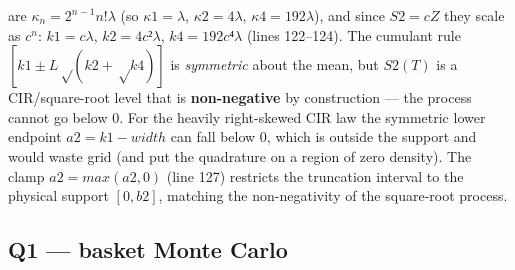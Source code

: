 \documentclass[
  11pt,
]{article}
\begin{document}
\begin{enumerate}
  are \(κ_n = 2^{n−1} n! λ\) (so \(κ1=λ\), \(κ2=4λ\), \(κ4=192λ\)), and
  since \(S2=cZ\) they scale as \(c^n\): \(k1=cλ\), \(k2=4c²λ\),
  \(k4=192c⁴λ\) (lines 122--124). The cumulant rule
  \([k1 ± L√(k2+√k4)]\) is \emph{symmetric} about the mean, but
  \(S2(T)\) is a CIR/square-root level that is \textbf{non-negative} by
  construction --- the process cannot go below 0. For the heavily
  right-skewed CIR law the symmetric lower endpoint \(a2 = k1 − width\)
  can fall below 0, which is outside the support and would waste grid
  (and put the quadrature on a region of zero density). The clamp
  \(a2 = max(a2, 0)\) (line 127) restricts the truncation interval to
  the physical support \([0, b2]\), matching the non-negativity of the
  square-root process.
\end{enumerate}

\hypertarget{q1-basket-monte-carlo}{%
\subsection{Q1 --- basket Monte Carlo}\label{q1-basket-monte-carlo}}
\end{document}
